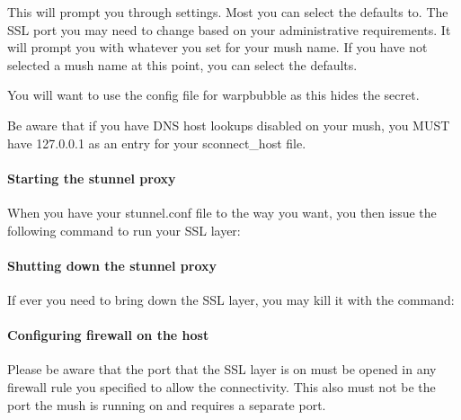 \documentclass[letterpaper,10pt,english]{sphinxmanual}
\begin{document}
\begin{sphinxVerbatim}[commandchars=\\\{\}]
\end{sphinxVerbatim}

\sphinxAtStartPar
This will prompt you through settings.  Most you can select the defaults to.
The SSL port you may need to change based on your administrative requirements.
It will prompt you with whatever you set for your mush name.  If you have not
selected a mush name at this point, you can select the defaults.

\sphinxAtStartPar
You will want to use the config file for warpbubble as this hides the secret.

\sphinxAtStartPar
Be aware that if you have DNS host lookups disabled on your mush, you
MUST have 127.0.0.1 as an entry for your sconnect\_host file.


\paragraph{Starting the stunnel proxy}
\label{\detokenize{security:starting-the-stunnel-proxy}}
\sphinxAtStartPar
When you have your stunnel.conf file to the way you want, you then
issue the following command to run your SSL layer:

\begin{sphinxVerbatim}[commandchars=\\\{\}]
\end{sphinxVerbatim}


\paragraph{Shutting down the stunnel proxy}
\label{\detokenize{security:shutting-down-the-stunnel-proxy}}
\sphinxAtStartPar
If ever you need to bring down the SSL layer, you may kill it with the command:

\begin{sphinxVerbatim}[commandchars=\\\{\}]
\end{sphinxVerbatim}


\paragraph{Configuring firewall on the host}
\label{\detokenize{security:configuring-firewall-on-the-host}}
\sphinxAtStartPar
Please be aware that the port that the SSL layer is on must be opened
in any firewall rule you specified to allow the connectivity.  This also must
not be the port the mush is running on and requires a separate port.
\end{document}
